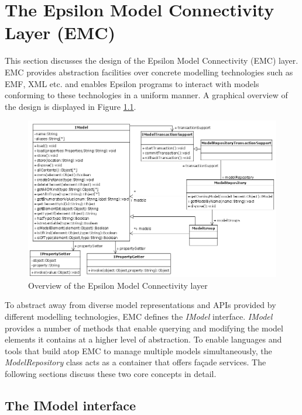 \chapter{The Epsilon Model Connectivity Layer (EMC)}
\label{sec:Design.EMC}

This section discusses the design of the Epsilon Model Connectivity (EMC) layer. EMC provides abstraction facilities over concrete modelling technologies such as EMF, XML etc. and enables Epsilon programs to interact with models conforming to these technologies in a uniform manner. A graphical overview of the design is displayed in Figure \ref{fig:EMC}.

\begin{landscape}

\begin{figure}
	\centering
		\includegraphics{images/EMC.png}
	\caption{Overview of the Epsilon Model Connectivity layer}
	\label{fig:EMC}
\end{figure}

\end{landscape}

To abstract away from diverse model representations and APIs provided by different modelling technologies, EMC defines the \emph{IModel} interface. \emph{IModel} provides a number of methods that enable querying and modifying the model elements it contains at a higher level of abstraction. To enable languages and tools that build atop EMC to manage multiple models simultaneously, the \emph{ModelRepository} class acts as a container that offers fa\c{c}ade services. The following sections discuss these two core concepts in detail.

\section{The IModel interface}

